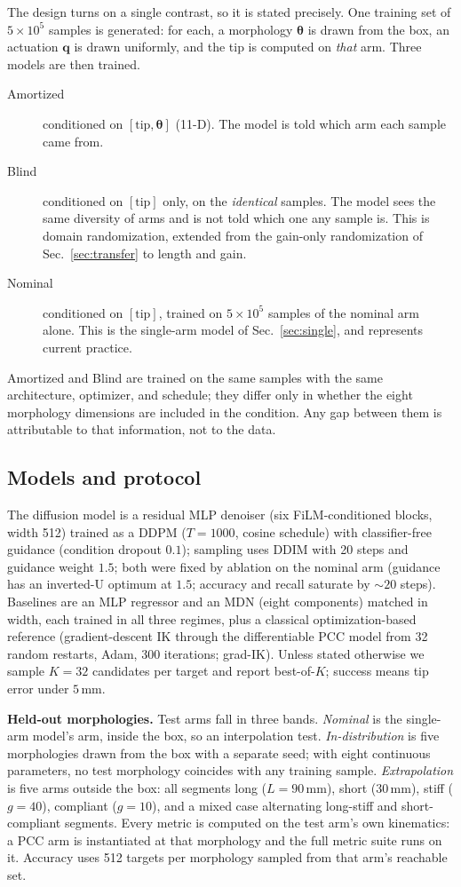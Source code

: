 \documentclass[robotics,article,submit,moreauthors]{Definitions/mdpi}
\begin{document}
The design turns on a single contrast, so it is stated precisely. One
training set of $5\times10^5$ samples is generated: for each, a morphology
$\boldsymbol{\theta}$ is drawn from the box, an actuation $\mathbf{q}$ is
drawn uniformly, and the tip is computed on \emph{that} arm. Three models
are then trained.
\begin{description}
  \item[Amortized] conditioned on $[\text{tip},\boldsymbol{\theta}]$
  (11-D). The model is told which arm each sample came from.
  \item[Blind] conditioned on $[\text{tip}]$ only, on the \emph{identical}
  samples. The model sees the same diversity of arms and is not told which
  one any sample is. This is domain randomization, extended from the
  gain-only randomization of Sec.~\ref{sec:transfer} to length and gain.
  \item[Nominal] conditioned on $[\text{tip}]$, trained on $5\times10^5$
  samples of the nominal arm alone. This is the single-arm model of
  Sec.~\ref{sec:single}, and represents current practice.
\end{description}
Amortized and Blind are trained on the same samples with the same
architecture, optimizer, and schedule; they differ only in whether the
eight morphology dimensions are included in the condition. Any gap between
them is attributable to that information, not to the data.

\subsection{Models and protocol}

The diffusion model is a residual MLP denoiser (six FiLM-conditioned blocks,
width 512) trained as a DDPM ($T{=}1000$, cosine schedule) with
classifier-free guidance (condition dropout $0.1$); sampling uses DDIM with
20 steps and guidance weight $1.5$; both were fixed by ablation on the nominal arm
(guidance has an inverted-U optimum at $1.5$; accuracy and recall saturate
by ${\sim}20$ steps).
Baselines are an MLP regressor and an MDN (eight components) matched in
width, each trained in all three regimes, plus a classical
optimization-based reference (gradient-descent IK through the differentiable
PCC model from 32 random restarts, Adam, 300 iterations; grad-IK). Unless
stated otherwise we sample $K{=}32$ candidates per target and report
best-of-$K$; success means tip error under $5\,$mm.

\textbf{Held-out morphologies.} Test arms fall in three bands. \emph{Nominal}
is the single-arm model's arm, inside the box, so an interpolation test.
\emph{In-distribution} is five morphologies drawn from the box with a
separate seed; with eight continuous parameters, no test morphology
coincides with any training sample. \emph{Extrapolation} is five arms
outside the box: all segments long ($L{=}90\,$mm), short ($30\,$mm),
stiff ($g{=}40$), compliant ($g{=}10$), and a mixed case alternating
long-stiff and short-compliant segments. Every metric is computed on the
test arm's own kinematics: a PCC arm is instantiated at that morphology and
the full metric suite runs on it. Accuracy uses 512 targets per morphology
sampled from that arm's reachable set.
\end{document}
